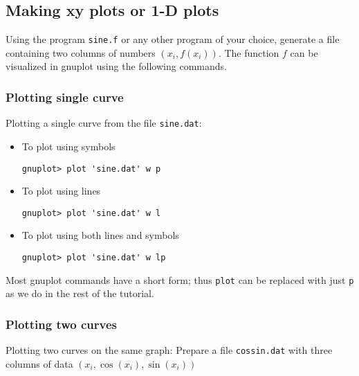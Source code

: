 \documentclass[11pt,oneside]{amsart}
\begin{document}
\subsection{Making xy plots or 1-D plots}
Using the program {\tt sine.f} or any other program of your choice, generate a file containing two columns of numbers $(x_i, f(x_i))$. The function $f$ can be visualized in gnuplot using the following commands.

\subsubsection{Plotting single curve}
Plotting a single curve from the file {\tt sine.dat}:

\begin{itemize}

\item To plot using symbols
\begin{verbatim}
gnuplot> plot 'sine.dat' w p
\end{verbatim}

\item To plot using lines
\begin{verbatim}
gnuplot> plot 'sine.dat' w l
\end{verbatim}

\item To plot using both lines and symbols
\begin{verbatim}
gnuplot> plot 'sine.dat' w lp
\end{verbatim}

\end{itemize}
Most gnuplot commands have a short form; thus {\tt plot} can be replaced with just {\tt p} as we do in the rest of the tutorial.

\subsubsection{Plotting two curves}
Plotting two curves on the same graph: Prepare a file {\tt cossin.dat} with three columns of data $(x_i, \cos(x_i), \sin(x_i))$
\end{document}
